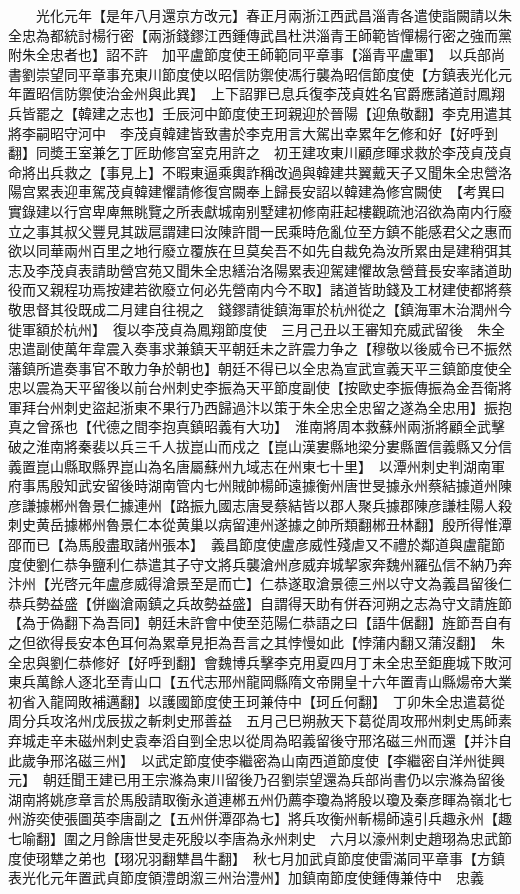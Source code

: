 　　光化元年【是年八月還京方改元】春正月兩浙江西武昌淄青各遣使詣闕請以朱全忠為都統討楊行密【兩浙錢鏐江西鍾傳武昌杜洪淄青王師範皆憚楊行密之強而黨附朱全忠者也】詔不許　加平盧節度使王師範同平章事【淄青平盧軍】　以兵部尚書劉崇望同平章事充東川節度使以昭信防禦使馮行襲為昭信節度使【方鎮表光化元年置昭信防禦使治金州與此異】　上下詔罪已息兵復李茂貞姓名官爵應諸道討鳳翔兵皆罷之【韓建之志也】壬辰河中節度使王珂親迎於晉陽【迎魚敬翻】李克用遣其將李嗣昭守河中　李茂貞韓建皆致書於李克用言大駕出幸累年乞修和好【好呼到翻】同奬王室兼乞丁匠助修宫室克用許之　初王建攻東川顧彦暉求救於李茂貞茂貞命將出兵救之【事見上】不暇東逼乘輿詐稱改過與韓建共翼戴天子又聞朱全忠營洛陽宫累表迎車駕茂貞韓建懼請修復宫闕奉上歸長安詔以韓建為修宫闕使　【考異曰實錄建以行宫卑庳無眺覽之所表獻城南别墅建初修南莊起樓觀疏池沼欲為南内行廢立之事其叔父豐見其跋扈謂建曰汝陳許間一民乘時危亂位至方鎮不能感君父之惠而欲以同華兩州百里之地行廢立覆族在旦莫矣吾不如先自裁免為汝所累由是建稍弭其志及李茂貞表請助營宫苑又聞朱全忠繕治洛陽累表迎駕建懼故急營葺長安率諸道助役而又親程功焉按建若欲廢立何必先營南内今不取】諸道皆助錢及工材建使都將蔡敬思督其役既成二月建自往視之　錢鏐請徙鎮海軍於杭州從之【鎮海軍木治潤州今徙軍額於杭州】　復以李茂貞為鳳翔節度使　三月己丑以王審知充威武留後　朱全忠遣副使萬年韋震入奏事求兼鎮天平朝廷未之許震力争之【穆敬以後威令已不振然藩鎮所遣奏事官不敢力争於朝也】朝廷不得已以全忠為宣武宣義天平三鎮節度使全忠以震為天平留後以前台州刺史李振為天平節度副使【按歐史李振傳振為金吾衛將軍拜台州刺史盜起浙東不果行乃西歸過汴以策于朱全忠全忠留之遂為全忠用】振抱真之曾孫也【代德之間李抱真鎮昭義有大功】　淮南將周本救蘇州兩浙將顧全武擊破之淮南將秦裴以兵三千人拔崑山而戍之【崑山漢婁縣地梁分婁縣置信義縣又分信義置崑山縣取縣界崑山為名唐屬蘇州九域志在州東七十里】　以潭州刺史判湖南軍府事馬殷知武安留後時湖南管内七州賊帥楊師遠據衡州唐世旻據永州蔡結據道州陳彦謙據郴州魯景仁據連州【路振九國志唐旻蔡結皆以郡人聚兵據郡陳彦謙桂陽人殺刺史黄岳據郴州魯景仁本從黄巢以病留連州遂據之帥所類翻郴丑林翻】殷所得惟潭邵而已【為馬殷盡取諸州張本】　義昌節度使盧彦威性殘虐又不禮於鄰道與盧龍節度使劉仁恭争鹽利仁恭遣其子守文將兵襲滄州彦威弃城挈家奔魏州羅弘信不納乃奔汴州【光啓元年盧彦威得滄景至是而亡】仁恭遂取滄景德三州以守文為義昌留後仁恭兵勢益盛【併幽滄兩鎮之兵故勢益盛】自謂得天助有併吞河朔之志為守文請旌節【為于偽翻下為吾同】朝廷未許會中使至范陽仁恭語之曰【語牛倨翻】旌節吾自有之但欲得長安本色耳何為累章見拒為吾言之其悖慢如此【悖蒲内翻又蒲沒翻】　朱全忠與劉仁恭修好【好呼到翻】會魏博兵擊李克用夏四月丁未全忠至鉅鹿城下敗河東兵萬餘人逐北至青山口【五代志邢州龍岡縣隋文帝開皇十六年置青山縣煬帝大業初省入龍岡敗補邁翻】以護國節度使王珂兼侍中【珂丘何翻】　丁卯朱全忠遣葛從周分兵攻洺州戊辰拔之斬刺史邢善益　五月己巳朔赦天下葛從周攻邢州刺史馬師素弃城走辛未磁州刺史袁奉滔自剄全忠以從周為昭義留後守邢洺磁三州而還【并汴自此歲争邢洺磁三州】　以武定節度使李繼密為山南西道節度使【李繼密自洋州徙興元】　朝廷聞王建已用王宗滌為東川留後乃召劉崇望還為兵部尚書仍以宗滌為留後　湖南將姚彦章言於馬殷請取衡永道連郴五州仍薦李瓊為將殷以瓊及秦彦睴為嶺北七州游奕使張圖英李唐副之【五州併潭邵為七】將兵攻衡州斬楊師遠引兵趣永州【趣七喻翻】圍之月餘唐世旻走死殷以李唐為永州刺史　六月以濠州刺史趙珝為忠武節度使珝犨之弟也【珝况羽翻犨昌牛翻】　秋七月加武貞節度使雷滿同平章事【方鎮表光化元年置武貞節度領澧朗溆三州治澧州】加鎮南節度使鍾傳兼侍中　忠義